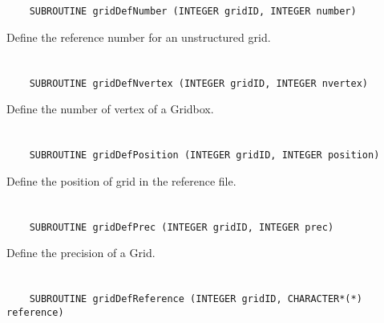 \section*{\tt {}}

\begin{verbatim}
    SUBROUTINE gridDefNumber (INTEGER gridID, INTEGER number)
\end{verbatim}

Define the reference number for an unstructured grid.


\section*{\tt {}}

\begin{verbatim}
    SUBROUTINE gridDefNvertex (INTEGER gridID, INTEGER nvertex)
\end{verbatim}

Define the number of vertex of a Gridbox.


\section*{\tt {}}

\begin{verbatim}
    SUBROUTINE gridDefPosition (INTEGER gridID, INTEGER position)
\end{verbatim}

Define the position of grid in the reference file.


\section*{\tt {}}

\begin{verbatim}
    SUBROUTINE gridDefPrec (INTEGER gridID, INTEGER prec)
\end{verbatim}

Define the precision of a Grid.


\section*{\tt {}}

\begin{verbatim}
    SUBROUTINE gridDefReference (INTEGER gridID, CHARACTER*(*) reference)
\end{verbatim}

